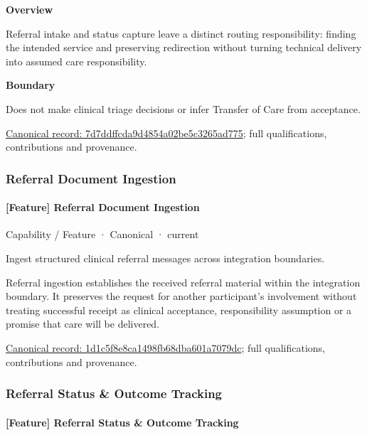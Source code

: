\textbf{Overview}



Referral intake and status capture leave a distinct routing responsibility: finding the intended service and preserving redirection without turning technical delivery into assumed care responsibility.



\textbf{Boundary}



Does not make clinical triage decisions or infer Transfer of Care from acceptance.


{\footnotesize \href{../../../../continuum/strategy/capability/feature/7d7ddffcda9d4854a02be5c3265ad775.md}{Canonical record: 7d7ddffcda9d4854a02be5c3265ad775}; full qualifications, contributions and provenance.}\par
\subsubsection{Referral Document Ingestion}

\paragraph{[Feature] Referral Document Ingestion}

\label{element:1d1c5f8e8ca1498fb68dba601a7079dc}
{\small Capability / Feature · Canonical · current}\par

Ingest structured clinical referral messages across integration boundaries.



Referral ingestion establishes the received referral material within the integration boundary. It preserves the request for another participant's involvement without treating successful receipt as clinical acceptance, responsibility assumption or a promise that care will be delivered.


{\footnotesize \href{../../../../continuum/strategy/capability/feature/1d1c5f8e8ca1498fb68dba601a7079dc.md}{Canonical record: 1d1c5f8e8ca1498fb68dba601a7079dc}; full qualifications, contributions and provenance.}\par
\subsubsection{Referral Status \& Outcome Tracking}

\paragraph{[Feature] Referral Status \& Outcome Tracking}

